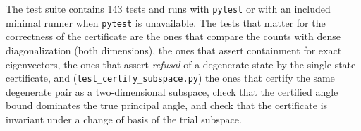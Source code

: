 The test suite contains 143 tests and runs with \texttt{pytest} or with an
included minimal runner when \texttt{pytest} is unavailable. The tests that
matter for the correctness of the certificate are the ones that compare the
counts with dense diagonalization (both dimensions), the ones that assert
containment for exact eigenvectors, the ones that assert \emph{refusal} of a
degenerate state by the single-state certificate, and
(\texttt{test\_certify\_subspace.py}) the ones that certify the same
degenerate pair as a two-dimensional subspace, check that the certified angle
bound dominates the true principal angle, and check that the certificate is
invariant under a change of basis of the trial subspace.
